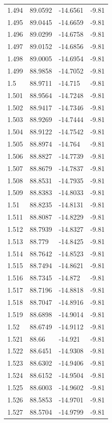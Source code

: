 \begin{tabular}{llll}
1.494 & 89.0592 & -14.6561 & -9.81 \\
1.495 & 89.0445 & -14.6659 & -9.81 \\
1.496 & 89.0299 & -14.6758 & -9.81 \\
1.497 & 89.0152 & -14.6856 & -9.81 \\
1.498 & 89.0005 & -14.6954 & -9.81 \\
1.499 & 88.9858 & -14.7052 & -9.81 \\
1.5 & 88.9711 & -14.715 & -9.81 \\
1.501 & 88.9564 & -14.7248 & -9.81 \\
1.502 & 88.9417 & -14.7346 & -9.81 \\
1.503 & 88.9269 & -14.7444 & -9.81 \\
1.504 & 88.9122 & -14.7542 & -9.81 \\
1.505 & 88.8974 & -14.764 & -9.81 \\
1.506 & 88.8827 & -14.7739 & -9.81 \\
1.507 & 88.8679 & -14.7837 & -9.81 \\
1.508 & 88.8531 & -14.7935 & -9.81 \\
1.509 & 88.8383 & -14.8033 & -9.81 \\
1.51 & 88.8235 & -14.8131 & -9.81 \\
1.511 & 88.8087 & -14.8229 & -9.81 \\
1.512 & 88.7939 & -14.8327 & -9.81 \\
1.513 & 88.779 & -14.8425 & -9.81 \\
1.514 & 88.7642 & -14.8523 & -9.81 \\
1.515 & 88.7494 & -14.8621 & -9.81 \\
1.516 & 88.7345 & -14.872 & -9.81 \\
1.517 & 88.7196 & -14.8818 & -9.81 \\
1.518 & 88.7047 & -14.8916 & -9.81 \\
1.519 & 88.6898 & -14.9014 & -9.81 \\
1.52 & 88.6749 & -14.9112 & -9.81 \\
1.521 & 88.66 & -14.921 & -9.81 \\
1.522 & 88.6451 & -14.9308 & -9.81 \\
1.523 & 88.6302 & -14.9406 & -9.81 \\
1.524 & 88.6152 & -14.9504 & -9.81 \\
1.525 & 88.6003 & -14.9602 & -9.81 \\
1.526 & 88.5853 & -14.9701 & -9.81 \\
1.527 & 88.5704 & -14.9799 & -9.81 \\

\end{tabular}
